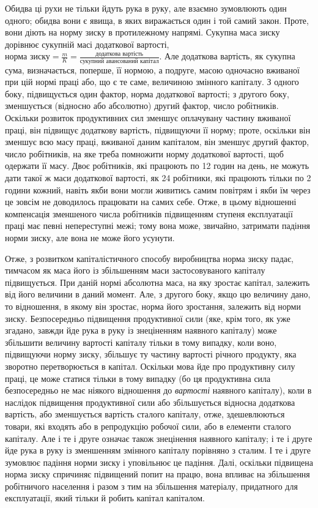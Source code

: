Обидва ці рухи не тільки йдуть рука в руку, але взаємно
зумовлюють один одного; обидва вони є явища, в яких
виражається один і той самий закон. Проте, вони діють на
норму зиску в протилежному напрямі. Сукупна маса зиску
дорівнює сукупній масі додаткової вартості, $\text{норма зиску} =
\frac{m}{K} = \frac{\text{додаткова вартість}}{\text{сукупний авансований капітал}}$. Але додаткова вартість, як сукупна сума,
визначається, поперше, її нормою, а подруге,
масою одночасно вживаної при цій нормі праці або, що є те
саме, величиною змінного капіталу. З одного боку, підвищується
один фактор, норма додаткової вартості; з другого боку, зменшується
(відносно або абсолютно) другий фактор, число робітників.
Оскільки розвиток продуктивних сил зменшує оплачувану
частину вживаної праці, він підвищує додаткову вартість, підвищуючи
її норму; проте, оскільки він зменшує всю масу
праці, вживаної даним капіталом, він зменшує другий фактор,
число робітників, на яке треба помножити норму додаткової
вартості, щоб одержати її масу. Двоє робітників, які працюють
по 12 годин на день, не можуть дати такої ж маси додаткової вартості,
як 24 робітники, які працюють тільки по 2 години кожний,
навіть якби вони могли живитись самим повітрям і якби їм через це
зовсім не доводилось працювати на самих себе. Отже, в цьому
відношенні компенсація зменшеного числа робітників підвищенням
ступеня експлуатації праці має певні непереступні межі;
тому вона може, звичайно, затримати падіння норми зиску, але
вона не може його усунути.

Отже, з розвитком капіталістичного способу виробництва
норма зиску падає, тимчасом як маса його із збільшенням маси
застосовуваного капіталу підвищується. При даній нормі абсолютна
маса, на яку зростає капітал, залежить від його величини
в даний момент. Але, з другого боку, якщо цю величину дано,
то відношення, в якому він зростає, норма його зростання, залежить
від норми зиску. Безпосередньо підвищення продуктивної
сили (яке, крім того, як уже згадано, завжди йде рука в руку із
знеціненням наявного капіталу) може збільшити величину вартості
капіталу тільки в тому випадку, коли воно, підвищуючи
норму зиску, збільшує ту частину вартості річного продукту,
яка зворотно перетворюється в капітал. Оскільки мова йде про
продуктивну силу праці, це може статися тільки в тому випадку
(бо ця продуктивна сила безпосередньо не має ніякого відношення
до \emph{вартості} наявного капіталу), коли в наслідок підвищення
продуктивної сили або збільшується відносна додаткова
вартість, або зменшується вартість сталого капіталу, отже, здешевлюються
товари, які входять або в репродукцію робочої сили,
або в елементи сталого капіталу. Але і те і друге означає також
знецінення наявного капіталу; і те і друге йде рука в руку із
зменшенням змінного капіталу порівняно з сталим. І те і друге
зумовлює падіння норми зиску і уповільнює це падіння. Далі,
оскільки підвищена норма зиску спричиняє підвищений попит на
працю, вона впливає на збільшення робітничого населення і разом
з тим на збільшення матеріалу, придатного для експлуатації, який
тільки й робить капітал капіталом.

